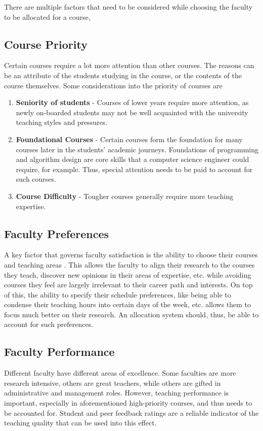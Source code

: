 There are multiple factors that need to be considered while choosing the faculty to be allocated for a course, 
\subsection{Course Priority}
Certain courses require a lot more attention than other courses. The reasons can be an attribute of the students studying in the course, or the contents of the course themselves. Some considerations into the priority of courses are
\begin{enumerate}
\item \textbf{Seniority of students} - Courses of lower years require more attention, as newly on-boarded students may not be well acquainted with the university teaching styles and pressures.
\item \textbf{Foundational Courses} - Certain courses form the foundation for many courses later in the students' academic journeys. Foundations of programming and algorithm design are core skills that a computer science engineer could require, for example. Thus, special attention needs to be paid to account for such courses.
\item \textbf{Course Difficulty} - Tougher courses generally require more teaching expertise.
\end{enumerate}

\subsection{Faculty Preferences}
A key factor that governs faculty satisfaction is the ability to choose their courses and teaching areas \parencite{schniederjans1987goal, badri1998multi}. This allows the faculty to align their research to the courses they teach, discover new opinions in their areas of expertise, etc. while avoiding courses they feel are largely irrelevant to their career path and interests. On top of this, the ability to specify their schedule preferences, like being able to condense their teaching hours into certain days of the week, etc. allows them to focus much better on their research. An allocation system should, thus, be able to account for such preferences.

\subsection{Faculty Performance}
Different faculty have different areas of excellence. Some faculties are more research intensive, others are great teachers, while others are gifted in administrative and management roles. However, teaching performance is important, especially in aforementioned high-priority courses, and thus needs to be accounted for. Student and peer feedback ratings are a reliable indicator of the teaching quality that can be used into this effect.


